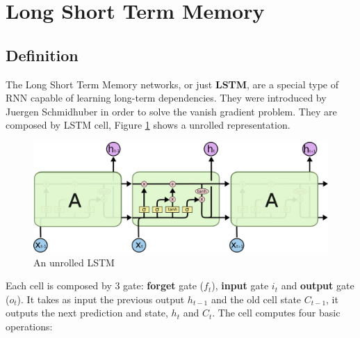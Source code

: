 \documentclass[11pt]{article}
\begin{document}
\section{Long Short Term Memory}
\subsection{Definition}
The Long Short Term Memory networks, or just \textbf{LSTM}, are a special type of RNN capable of learning long-term
dependencies. They were introduced by Juergen Schmidhuber in order to solve the vanish gradient problem. They are composed by LSTM cell, 
Figure \ref{fig: unrolled_LSTM} shows a unrolled representation.
\begin{figure}[H]
\centering
\includegraphics[scale=0.5]{./images/LSTM3-chain.png}	
\caption{An unrolled LSTM}
\label{fig: unrolled_LSTM}
\end{figure}
Each cell is composed by 3 gate: \textbf{forget} gate ($f_t$), \textbf{input} gate $i_t$ and \textbf{output} gate ($o_t$). It takes as 
input the previous output $h_{t - 1}$ and the old cell state $C_{t-1}$, it outputs the next prediction and state, $h_{t}$ and $C_t$. The cell
computes four basic operations:  
\end{document}
